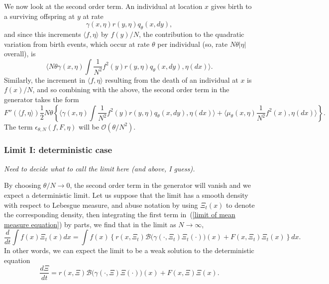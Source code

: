 \documentclass[12pt]{article}
\newcommand{\bigO}{\mathcal{O}}
\newcommand{\DG}{\mathcal{B}}  %
\newcommand{\comment}[1]{{\color{blue} \it #1}}
\begin{document}

We now look at the second order term.
An individual at location $x$ gives birth 
to a surviving offspring at $y$ at rate
$$
\gamma(x,\eta) r(y,\eta) q_{\theta}(x, dy) ,
$$
and since this increments $\langle f, \eta \rangle$ by $f(y) / N$,
the contribution to the quadratic variation from birth events,
which occur at rate $\theta$ per individual 
(so, rate $N\theta |\eta|$ overall), is
$$
\langle
    N \theta \gamma(x,\eta)
    \int \frac{1}{N^2} f^2(y) r(y,\eta)
    q_\theta(x,dy) 
    , \eta(dx)
\rangle .
$$
Similarly, the increment in $\langle f, \eta\rangle$ resulting from 
the death of an individual at $x$ is $f(x)/N$, and so combining with the 
above, the second order term in the generator takes the form
$$
F''(\langle f,\eta\rangle)
\frac{1}{2} N \theta
\left\{
    \langle
        \gamma(x,\eta)
        \int \frac{1}{N^2}f^2(y)r(y,\eta)q_\theta(x,dy) 
    , \eta(dx)\rangle
    +
    \langle
        \mu_\theta(x,\eta)\frac{1}{N^2}f^2(x) 
    ,\eta(dx)\rangle
\right\} .
$$
The term $\epsilon_{\theta,N}(f, F, \eta)$ will be 
$\bigO(\theta/N^2)$.

\subsubsection*{Limit I: deterministic case}

\comment{Need to decide what to call the limit here (and above, I guess).}

By choosing $\theta/N\rightarrow 0$, the second order term in the generator 
will vanish and we expect a deterministic limit. 
Let us suppose that the limit has a smooth density with respect to
Lebesgue measure, and abuse notation by using $\Xi_t(x)$
to denote the corresponding density, then integrating the first term in~(\ref{limit of mean measure equation})
by parts, we find that in the limit as $N\to\infty$,
\begin{equation*}
\frac{d}{dt}\int f(x)\Xi_t(x)dx
=
\int f(x)\left\{r(x,\Xi_t)\DG\big(\gamma(\cdot,\Xi_t)
\Xi_t(\cdot)\big)(x)
+
F(x,\Xi_t) \Xi_t(x)
\right\} dx.
\end{equation*}
In other words, we can expect the limit to be a weak solution to the 
deterministic equation
\begin{equation}
\label{deterministic limit}
\frac{d\Xi}{dt}
=r(x,\Xi)\DG\big(\gamma(\cdot,\Xi)
\Xi(\cdot)\big)(x)+F(x,\Xi)
\Xi(x).
\end{equation}
\end{document}

